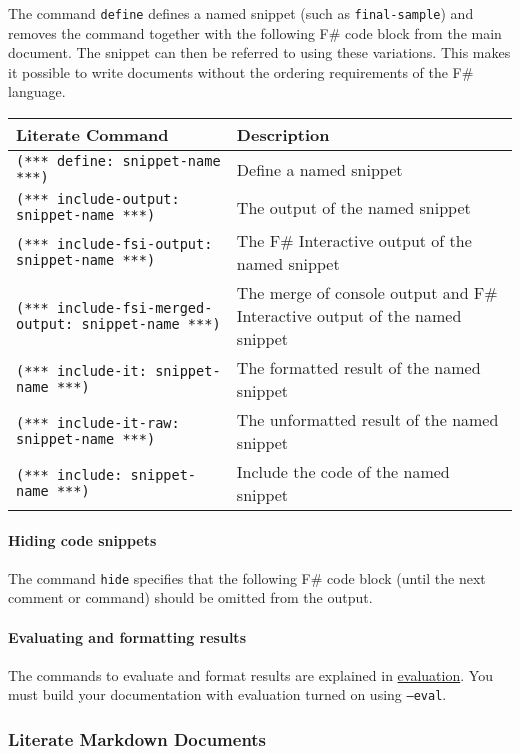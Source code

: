 \documentclass{article}
\begin{document}
The command \texttt{define} defines a named snippet (such as \texttt{final-sample}) and removes the command together with
the following F\# code block from the main document. The snippet can then
be referred to using these variations. This makes it
possible to write documents without the ordering requirements of the
F\# language.
\begin{tabular}{|l|l|}\hline
\textbf{Literate Command} & \textbf{Description}\\ \hline\hline
\texttt{(*** define: snippet-name ***)} & Define a named snippet\\ \hline
\texttt{(*** include-output: snippet-name ***)} & The output of the named snippet\\ \hline
\texttt{(*** include-fsi-output: snippet-name ***)} & The F\# Interactive output of the named snippet\\ \hline
\texttt{(*** include-fsi-merged-output: snippet-name ***)} & The merge of console output and F\# Interactive output of the named snippet\\ \hline
\texttt{(*** include-it: snippet-name ***)} & The formatted result of the named snippet\\ \hline
\texttt{(*** include-it-raw: snippet-name ***)} & The unformatted result of the named snippet\\ \hline
\texttt{(*** include: snippet-name ***)} & Include the code of the named snippet\\ \hline
\end{tabular}

\paragraph{Hiding code snippets}



The command \texttt{hide} specifies that the following F\# code block (until the next comment or command) should be
omitted from the output.
\paragraph{Evaluating and formatting results}



The commands to evaluate and format results are explained in \href{evaluation.html}{evaluation}.
You must build your documentation with evaluation turned on using \texttt{--eval}.
\subsubsection*{Literate Markdown Documents}
\end{document}
